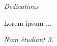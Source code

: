 \begin{center}
\Huge{\emph{Dedications}}
\end{center}

\vspace{1cm}

Lorem ipsum ...

\vspace{3cm}
\begin{flushright}
	\textit{Nom étudiant 3.}
\end{flushright}